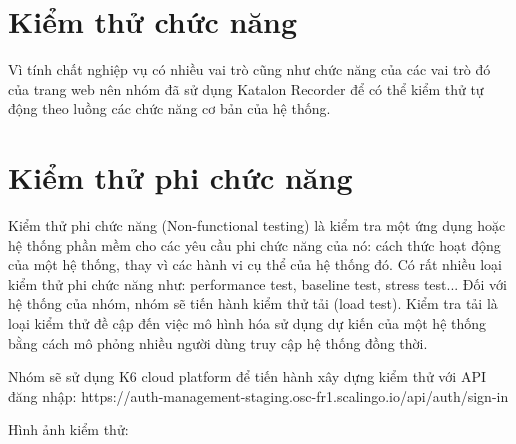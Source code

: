 		\newpage
		
		\section{Kiểm thử chức năng}
		    Vì tính chất nghiệp vụ có nhiều vai trò cũng như chức năng của các vai trò đó của trang web nên nhóm đã sử dụng Katalon Recorder để có thể kiểm thử tự động theo luồng các chức năng cơ bản của hệ thống.
			
		\section{Kiểm thử phi chức năng}
		    Kiểm thử phi chức năng (Non-functional testing) là kiểm tra một ứng dụng hoặc hệ thống phần mềm cho các yêu cầu phi chức năng của nó: cách thức hoạt động của một hệ thống, thay vì các hành vi cụ thể của hệ thống đó. Có rất nhiều loại kiểm thử phi chức năng như: performance test, baseline test, stress test... Đối với hệ thống của nhóm, nhóm sẽ tiến hành kiểm thử tải (load test). Kiểm tra tải là loại kiểm thử đề cập đến việc mô hình hóa sử dụng dự kiến của một hệ thống bằng cách mô phỏng nhiều người dùng truy cập hệ thống đồng thời.
		    
		    Nhóm sẽ sử dụng K6 cloud platform để tiến hành xây dựng kiểm thử với API đăng nhập:
		    https://auth-management-staging.osc-fr1.scalingo.io/api/auth/sign-in
		    
		Hình ảnh kiểm thử:
        
